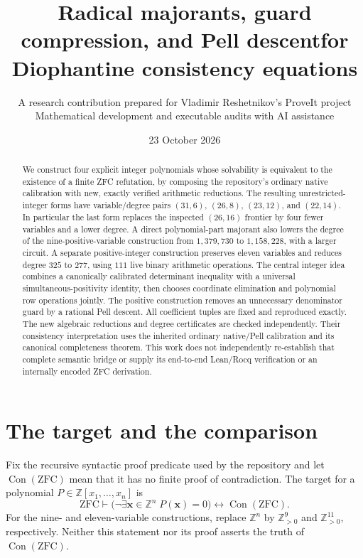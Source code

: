 \documentclass[11pt]{article}
\title{Radical majorants, guard compression, and Pell descent\newline for Diophantine consistency equations}
\author{A research contribution prepared for Vladimir Reshetnikov's ProveIt project\\
\small Mathematical development and executable audits with AI assistance}
\date{23 October 2026}
\newcommand{\Z}{\mathbb Z}
\newcommand{\Con}{\operatorname{Con}}
\newcommand{\ZFC}{\mathrm{ZFC}}
\begin{document}
\maketitle
\begin{abstract}
We construct four explicit integer polynomials whose solvability is equivalent
to the existence of a finite ZFC refutation, by composing the repository's
ordinary native calibration with new, exactly verified arithmetic reductions.
The resulting unrestricted-integer forms have variable/degree pairs
$(31,6)$, $(26,8)$, $(23,12)$, and $(22,14)$.
In particular the last form replaces the inspected $(26,16)$ frontier by
four fewer variables and a lower degree. A direct polynomial-part majorant
also lowers the degree of the nine-positive-variable construction from
$1{,}379{,}730$ to $1{,}158{,}228$, with a larger circuit. A separate positive-integer
construction preserves eleven variables and reduces degree $325$ to $277$,
using $111$ live binary arithmetic operations.
The central integer idea combines a canonically calibrated determinant
inequality with a universal simultaneous-positivity identity, then chooses
coordinate elimination and polynomial row operations jointly.
The positive construction removes an unnecessary denominator guard by a
rational Pell descent.
All coefficient tuples are fixed and reproduced exactly. The new algebraic
reductions and degree certificates are checked independently. Their
consistency interpretation uses the inherited ordinary native/Pell
calibration and its canonical completeness theorem. This work does not
independently re-establish that complete semantic bridge or supply its
end-to-end Lean/Rocq verification or an internally encoded ZFC derivation.
\end{abstract}
\newpage
\tableofcontents
\newpage

\section{The target and the comparison}
Fix the recursive syntactic proof predicate used by the repository and let
$\Con(\ZFC)$ mean that it has no finite proof of contradiction.
The target for a polynomial $P\in\Z[x_1,\ldots,x_n]$ is
\begin{equation}\label{eq:target}
 \ZFC\vdash
 \bigl(\neg\exists\boldsymbol{x}\in\Z^n\;P(\boldsymbol{x})=0\bigr)
 \longleftrightarrow\Con(\ZFC).
\end{equation}
For the nine- and eleven-variable constructions, replace $\Z^n$ by
$\Z_{>0}^{9}$ and $\Z_{>0}^{11}$, respectively.
Neither this statement nor its proof asserts the truth
of $\Con(\ZFC)$.
\end{document}
